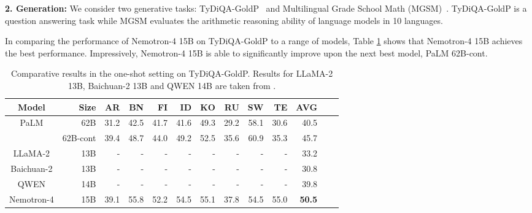 \documentclass[11pt]{article}
\newcommand{\shrimai}[1]{{\color{red}{\textbf{Shrimai}: #1}}}
\newcommand{\ours}{Nemotron-4}
\begin{document}
\textbf{2. Generation:} We consider two generative tasks: TyDiQA-GoldP~\citep{tydiqa} and Multilingual Grade School Math (MGSM)~\citep{shi2022language}. TyDiQA-GoldP is a question answering task while MGSM evaluates the arithmetic reasoning ability of language models in 10 languages.


In comparing the performance of \ours{} 15B on TyDiQA-GoldP to a range of models, Table \ref{tab:tydiqa_internal} shows that \ours{} 15B achieves the best performance. Impressively, \ours{} 15B is able to significantly improve upon the next best model, PaLM 62B-cont. 


\begin{table}[H]
\centering
\begin{adjustbox}{max width=\textwidth, scale=1.0}
\begin{tabular}{crrrrrrrrrrrr}
\toprule
Model & Size & AR & BN & FI & ID & KO & RU & SW & TE & AVG  \\
\midrule
\multirow{2}{*}{PaLM}& 62B & 31.2 & 42.5 & 41.7 & 41.6	& 49.3 & 29.2 &	58.1 & 30.6 &	40.5    \\
 & 62B-cont & 39.4	& 48.7 & 44.0 &	49.2	&52.5&	35.6 &	60.9&	35.3	& 45.7    \\
 LLaMA-2 & 13B & -& -& -& -& -& -& -& -& 33.2 \\
 Baichuan-2 & 13B & -& -& -& -& -& -& -& -& 30.8\\
 QWEN & 14B & -& -& -& -& -& -& -& -& 39.8 \\
\ours{} & 15B & 39.1 & 55.8 &52.2 & 54.5 & 55.1 & 37.8 & 54.5 & 55.0 & \textbf{50.5} \\
\bottomrule
\end{tabular}
\end{adjustbox}
\caption{\label{tab:tydiqa_internal} Comparative results in the one-shot setting on TyDiQA-GoldP. Results for LLaMA-2 13B, Baichuan-2 13B and QWEN 14B are taken from \citep{chen2024orion14b}.  }
\end{table}
\end{document}
